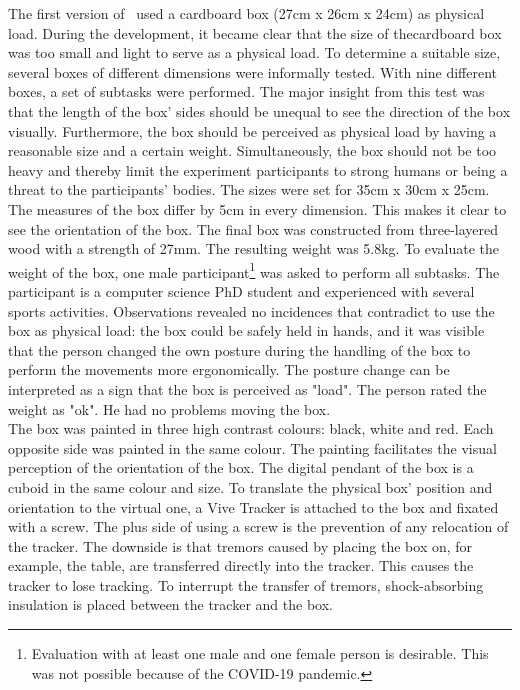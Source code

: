 The first version of \exgo\ used a cardboard box (27cm x 26cm x 24cm) as physical load. During the development, it became clear that the size of thecardboard box was too small and light to serve as a physical load. To determine a suitable size, several boxes of different dimensions were informally tested. With nine different boxes, a set of subtasks were performed. The major insight from this test was that the length of the box' sides should be unequal to see the direction of the box visually. Furthermore, the box should be perceived as physical load by having a reasonable size and a certain weight. Simultaneously, the box should not be too heavy and thereby limit the experiment participants to strong humans or being a threat to the participants' bodies. The sizes were set for 35cm x 30cm x 25cm. The measures of the box differ by 5cm in every dimension. This makes it clear to see the orientation of the box. The final box was constructed from three-layered wood with a strength of 27mm. The resulting weight was 5.8kg. To evaluate the weight of the box, one male participant\footnote{Evaluation with at least one male and one female person is desirable. This was not possible because of the COVID-19 pandemic.} was asked to perform all subtasks. The participant is a computer science PhD student and experienced with several sports activities. Observations revealed no incidences that contradict to use the box as physical load: the box could be safely held in hands, and it was visible that the person changed the own posture during the handling of the box to perform the movements more ergonomically. The posture change can be interpreted as a sign that the box is perceived as "load". The person rated the weight as "ok". He had no problems moving the box.\\
The box was painted in three high contrast colours: black, white and red. Each opposite side was painted in the same colour. The painting facilitates the visual perception of the orientation of the box. The digital pendant of the box is a cuboid in the same colour and size. To translate the physical box' position and orientation to the virtual one, a Vive Tracker is attached to the box and fixated with a screw. The plus side of using a screw is the prevention of any relocation of the tracker. The downside is that tremors caused by placing the box on, for example, the table, are transferred directly into the tracker. This causes the tracker to lose tracking. To interrupt the transfer of tremors, shock-absorbing insulation is placed between the tracker and the box.\\
